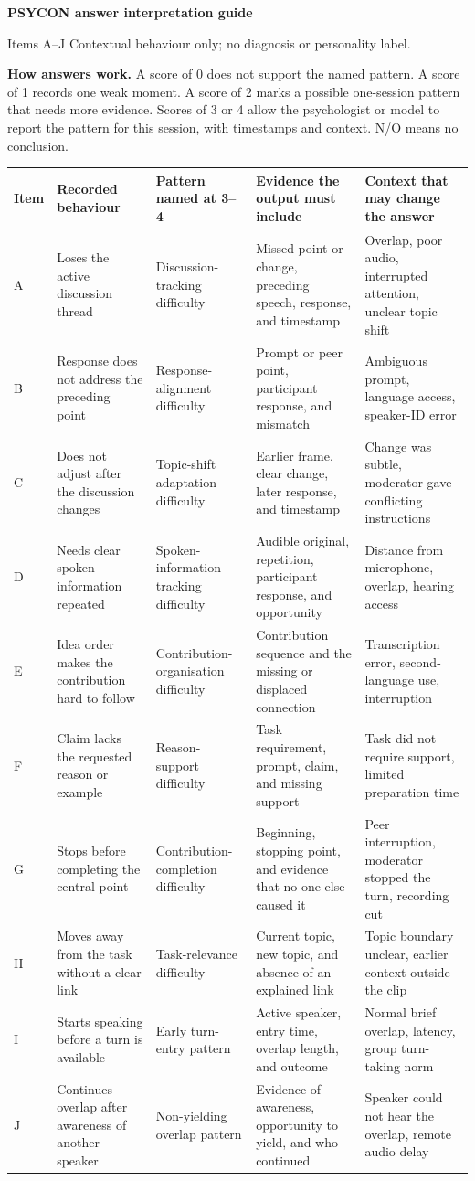 \documentclass[10pt,a4paper]{article}
\newcommand{\GuideTitle}[1]{
{\LARGE\bfseries\color{PSYCONBlue}PSYCON answer interpretation guide}\par
{\small #1 \quad Contextual behaviour only; no diagnosis or personality label.}\par
\vspace{1.5mm}{\color{PSYCONBlue}\rule{\linewidth}{0.7pt}}\vspace{1.5mm}}
\begin{document}
\GuideTitle{Items A--J}
\textbf{How answers work.} A score of 0 does not support the named pattern. A score of 1 records one weak moment. A score of 2 marks a possible one-session pattern that needs more evidence. Scores of 3 or 4 allow the psychologist or model to report the pattern for this session, with timestamps and context. N/O means no conclusion.

\vspace{1.5mm}
\begingroup\scriptsize
\begin{tabularx}{\linewidth}{@{}L{8mm}L{47mm}L{39mm}L{65mm}Y@{}}
\toprule
\textbf{Item} & \textbf{Recorded behaviour} & \textbf{Pattern named at 3--4} & \textbf{Evidence the output must include} & \textbf{Context that may change the answer}\\\midrule
A & Loses the active discussion thread & Discussion-tracking difficulty & Missed point or change, preceding speech, response, and timestamp & Overlap, poor audio, interrupted attention, unclear topic shift\\
B & Response does not address the preceding point & Response-alignment difficulty & Prompt or peer point, participant response, and mismatch & Ambiguous prompt, language access, speaker-ID error\\
C & Does not adjust after the discussion changes & Topic-shift adaptation difficulty & Earlier frame, clear change, later response, and timestamp & Change was subtle, moderator gave conflicting instructions\\
D & Needs clear spoken information repeated & Spoken-information tracking difficulty & Audible original, repetition, participant response, and opportunity & Distance from microphone, overlap, hearing access\\
E & Idea order makes the contribution hard to follow & Contribution-organisation difficulty & Contribution sequence and the missing or displaced connection & Transcription error, second-language use, interruption\\
F & Claim lacks the requested reason or example & Reason-support difficulty & Task requirement, prompt, claim, and missing support & Task did not require support, limited preparation time\\
G & Stops before completing the central point & Contribution-completion difficulty & Beginning, stopping point, and evidence that no one else caused it & Peer interruption, moderator stopped the turn, recording cut\\
H & Moves away from the task without a clear link & Task-relevance difficulty & Current topic, new topic, and absence of an explained link & Topic boundary unclear, earlier context outside the clip\\
I & Starts speaking before a turn is available & Early turn-entry pattern & Active speaker, entry time, overlap length, and outcome & Normal brief overlap, latency, group turn-taking norm\\
J & Continues overlap after awareness of another speaker & Non-yielding overlap pattern & Evidence of awareness, opportunity to yield, and who continued & Speaker could not hear the overlap, remote audio delay\\
\bottomrule
\end{tabularx}
\endgroup
\end{document}
